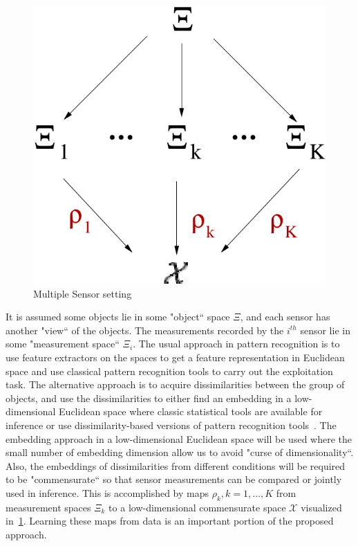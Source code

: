 \documentclass[11pt]{article} %
\begin{document}
\begin{figure}
\centering
\includegraphics[scale=0.75]{gen-model-orig-proj.pdf}
\caption{Multiple Sensor setting}
\label{fig:fig1}
\end{figure}


It is assumed some objects lie in some "object`` space $\Xi$, and each sensor has another "view`` of the objects. The measurements recorded by the $i^{th}$ sensor lie in some "measurement space`` $\Xi_i$. The usual approach in pattern recognition is to use feature extractors on the spaces to get a feature representation in Euclidean space and use classical pattern recognition tools to carry out the exploitation task. The alternative approach is to acquire dissimilarities between the group of objects, and use the dissimilarities to either find an embedding in a low-dimensional Euclidean space where classic statistical tools are available for inference or use dissimilarity-based versions of pattern recognition tools~\cite{duin2005dissimilarity}. The embedding approach in a  low-dimensional Euclidean space will be used where the small number of embedding dimension allow us to avoid "curse of dimensionality``. Also, the embeddings of dissimilarities from  different conditions will be required to be "commensurate`` so that sensor measurements can be compared or jointly used in inference. This is accomplished by maps $\rho_k,k=1,\ldots,K$ from measurement spaces $\Xi_k$ to a low-dimensional commensurate space $\mathcal{X}$ visualized in~\ref{fig:fig1}. Learning these maps from data is  an important portion of the proposed  approach.
\end{document}
